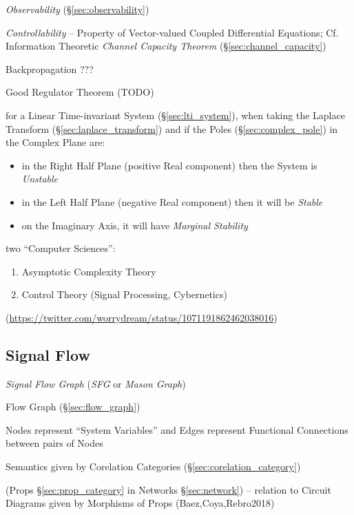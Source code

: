 \emph{Observability} (\S\ref{sec:observability})

\emph{Controllability} -- Property of Vector-valued Coupled
Differential Equations; \fist Cf. Information Theoretic \emph{Channel
  Capacity Theorem} (\S\ref{sec:channel_capacity})

Backpropagation ???

Good Regulator Theorem (TODO)

for a Linear Time-invariant System (\S\ref{sec:lti_system}), when taking the
Laplace Transform (\S\ref{sec:laplace_transform}) and if the Poles
(\S\ref{sec:complex_pole}) in the Complex Plane are:
\begin{itemize}
  \item in the Right Half Plane (positive Real component) then the System is
    \emph{Unstable}
  \item in the Left Half Plane (negative Real component) then it will be
    \emph{Stable}
  \item on the Imaginary Axis, it will have \emph{Marginal Stability}
\end{itemize}

two ``Computer Sciences'':
\begin{enumerate}
  \item Asymptotic Complexity Theory
  \item Control Theory (Signal Processing, Cybernetics)
\end{enumerate}
(\url{https://twitter.com/worrydream/status/1071191862462038016})



\subsection{Signal Flow}\label{sec:signal_flow}

\emph{Signal Flow Graph} (\emph{SFG} or \emph{Mason Graph})

\fist Flow Graph (\S\ref{sec:flow_graph})

Nodes represent ``System Variables'' and Edges represent Functional
Connections between pairs of Nodes

Semantics given by Corelation Categories
(\S\ref{sec:corelation_category})

(Props \S\ref{sec:prop_category} in Networks \S\ref{sec:network}) -- relation to
Circuit Diagrams given by Morphisms of Props (Baez,Coya,Rebro2018)

